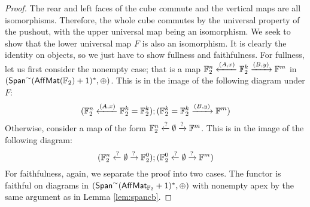 \begin{proof}
 The rear and left faces of the cube commute and the vertical maps are all isomorphisms. Therefore, the whole cube commutes by the universal property of the pushout, with the upper universal map being an isomorphism.
We seek to show that the lower universal map  $F$ is also an isomorphism.  It is clearly the identity on objects, so we just have to show fullness and faithfulness.
For fullness, let us first consider the nonempty case; that is a map $\mathbb{F}_2^n \xleftarrow{(A,x)} \mathbb{F}_2^k \xrightarrow{(B,y)}\mathbb{F}^m$ in $(\mathsf{Span}^\sim (\mathsf{Aff}\mathsf{Mat}(\mathbb{F}_2)+1)^*,\oplus)$.  This is in the image of the following diagram under $F$:
$$
(\mathbb{F}_2^n \xleftarrow{(A,x)} \mathbb{F}_2^k  = \mathbb{F}_2^k); (\mathbb{F}_2^k = \mathbb{F}_2^k  \xrightarrow{(B,y)}\mathbb{F}^m)
$$ 
Otherwise, consider a map of the form  $\mathbb{F}_2^n \xleftarrow{?} \emptyset  \xrightarrow{?}\mathbb{F}^m$.  This is in the image of the following diagram:
$$
(\mathbb{F}_2^n \xleftarrow{?} \emptyset \xrightarrow {?} \mathbb{F}_2^0  );(\mathbb{F}_2^0 \xleftarrow{?} \emptyset  \xrightarrow{?}\mathbb{F}^m)
$$
For faithfulness, again, we separate the proof into two cases.  The functor is faithful on diagrams in $(\mathsf{Span}^\sim(\mathsf{Aff}\mathsf{Mat}_{\mathbb{F}_2}+1)^*,\oplus)$ with nonempty apex by the same argument as in Lemma \ref{lem:spancb}.

\end{proof}
